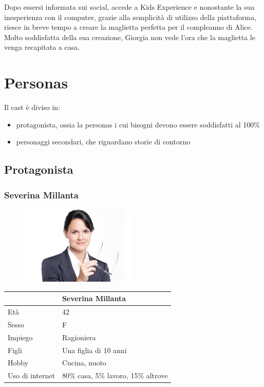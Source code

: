 \documentclass[12pt,italian,]{report}
\providecommand{\tightlist}{%
  \setlength{\itemsep}{0pt}\setlength{\parskip}{0pt}}
\begin{document}
Dopo essersi informata sui social, accede a Kids Experience e nonostante
la sua inesperienza con il computer, grazie alla semplicità di utilizzo
della piattaforma, riesce in breve tempo a creare la maglietta perfetta
per il compleanno di Alice. Molto soddisfatta della sua creazione,
Giorgia non vede l'ora che la maglietta le venga recapitata a casa.
\newpage
\hypertarget{personas}{%
\section{Personas}\label{personas}}

Il cast è diviso in:

\begin{itemize}
\tightlist
\item
  protagonista, ossia la personas i cui bisogni devono essere soddisfatti
  al 100\%
\item
  personaggi secondari, che riguardano storie di contorno
\end{itemize}

\hypertarget{protagonista}{%
\subsection{Protagonista}\label{protagonista}}

\hypertarget{severina-millanta}{%
\subsubsection{Severina Millanta}\label{severina-millanta}}

\begin{figure}[h]
\centering
\includegraphics[width=0.50\textwidth]{img/severina.jpg}
\end{figure}

\begin{longtable}[h]{@{}ll@{}}
\toprule
& Severina Millanta\tabularnewline
\midrule
\endhead
Età & 42\tabularnewline
Sesso & F\tabularnewline
Impiego & Ragioniera\tabularnewline
Figli & Una figlia di 10 anni\tabularnewline
Hobby & Cucina, nuoto\tabularnewline
Uso di internet & 80\% casa, 5\% lavoro, 15\% altrove\tabularnewline
\bottomrule
\end{longtable}
\end{document}
